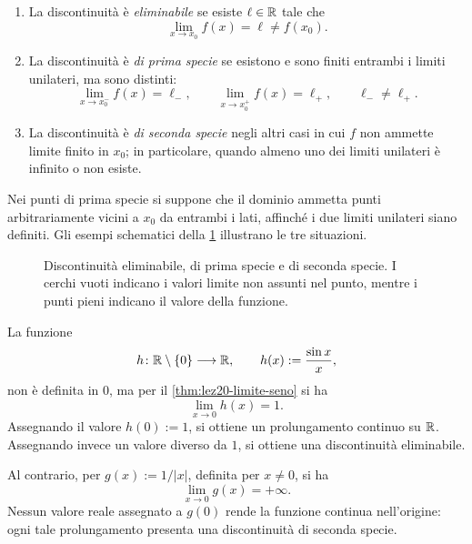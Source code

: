 \begin{definition}
\label{def:lez21-tipi-discontinuita}
\begin{enumerate}
  \item La discontinuità è \emph{eliminabile} se
  esiste \(\ell\in\mathbb{R}\) tale che
  \[
    \lim_{x\to x_0}f(x)=\ell\ne f(x_0).
  \]
  \item La discontinuità è \emph{di prima specie}
  se esistono e sono finiti entrambi i limiti unilateri,
  ma sono distinti:
  \[
    \lim_{x\to x_0^-}f(x)=\ell_-,\qquad
    \lim_{x\to x_0^+}f(x)=\ell_+,
    \qquad\ell_-\ne\ell_+.
  \]
  \item La discontinuità è \emph{di seconda specie}
  negli altri casi in cui \(f\) non ammette limite
  finito in \(x_0\); in particolare, quando
  almeno uno dei limiti unilateri è infinito
  o non esiste.
\end{enumerate}
\end{definition}

Nei punti di prima specie si suppone che il dominio
ammetta punti arbitrariamente vicini a \(x_0\) da
entrambi i lati, affinché i due limiti unilateri
siano definiti. Gli esempi schematici della
\cref{fig:lez21-tipi-discontinuita} illustrano le
tre situazioni.

\begin{figure}[htbp]
  \centering
  
  \caption{Discontinuità eliminabile, di prima specie e
  di seconda specie. I cerchi vuoti indicano i valori
  limite non assunti nel punto, mentre i punti pieni
  indicano il valore della funzione.}
  \label{fig:lez21-tipi-discontinuita}
\end{figure}

\begin{example}
\label{ex:lez21-prolungamenti}
La funzione
\[
  h\colon\mathbb{R}\setminus\{0\}\longrightarrow\mathbb{R},
  \qquad h(x):=\frac{\sin x}{x},
\]
non è definita in \(0\), ma per il
\cref{thm:lez20-limite-seno} si ha
\[
  \lim_{x\to0}h(x)=1.
\]
Assegnando il valore \(h(0):=1\), si ottiene un
prolungamento continuo su \(\mathbb{R}\). Assegnando
invece un valore diverso da \(1\), si ottiene una
discontinuità eliminabile.

Al contrario, per \(g(x):=1/|x|\), definita per
\(x\ne0\), si ha
\[
  \lim_{x\to0}g(x)=+\infty.
\]
Nessun valore reale assegnato a \(g(0)\) rende
la funzione continua nell'origine: ogni tale
prolungamento presenta una discontinuità
di seconda specie.
\end{example}

